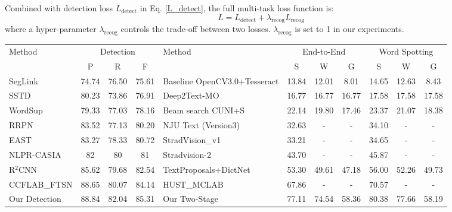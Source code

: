 \documentclass[10pt,twocolumn,letterpaper]{article}
\begin{document}
Combined with detection loss $L_{\text{detect}}$ in Eq. \eqref{L_detect}, the full multi-task loss function is:
\begin{equation}
L = L_{\text{detect}} + \lambda_{\text{recog}} L_{\text{recog}}
\end{equation}
where a hyper-parameter $\lambda_{\text{recog}}$ controls the trade-off between two losses. $\lambda_{\text{recog}}$ is set to 1 in our experiments.
\begin{table*}
\small
\begin{center}
\setlength{\tabcolsep}{5pt}
\begin{tabular}{l|ccc|l|ccc|ccc}
\hline
\multirow{2}{*}{Method} & \multicolumn{3}{c|}{Detection} & \multirow{2}{*}{Method} & \multicolumn{3}{c|}{End-to-End} & \multicolumn{3}{c}{Word Spotting}\\ \cline{2-4} \cline{6-11}
 & P & R & F & & S & W & G & S & W & G \\ \hline
SegLink \cite{shi2017seglink} & 74.74 & 76.50 & 75.61 & Baseline OpenCV3.0+Tesseract \cite{karatzas2015icdar15} & 13.84 & 12.01 & 8.01 & 14.65 & 12.63 & 8.43 \\
SSTD \cite{he2017sstd} & 80.23 & 73.86 & 76.91 & Deep2Text-MO \cite{yin2014robust,yin2015multi,jaderberg2016ijcv} & 16.77 & 16.77 & 16.77 & 17.58 & 17.58 & 17.58\\
WordSup \cite{hu2017wordsup} & 79.33 & 77.03& 78.16 & Beam search CUNI+S \cite{karatzas2015icdar15} & 22.14 & 19.80 & 17.46 & 23.37 & 21.07 & 18.38\\
RRPN \cite{ma2017rcnn} & 83.52 & 77.13 & 80.20 & NJU Text (Version3) \cite{karatzas2015icdar15} & 32.63 & - & - & 34.10 & - & - \\
EAST \cite{zhou2017east} & 83.27 & 78.33 & 80.72 & StradVision\_v1 \cite{karatzas2015icdar15} & 33.21 & - & - & 34.65 & - & - \\
NLPR-CASIA \cite{he2017casia} & 82 & 80 & 81 & Stradvision-2 \cite{karatzas2015icdar15} & 43.70 & - & - & 45.87 & - & - \\
R$^2$CNN \cite{jiang2017r2cnn} & 85.62 &79.68 & 82.54 & TextProposals+DictNet \cite{gomez2017textproposals,jaderberg2014synthetic} & 53.30 & 49.61 & 47.18 & 56.00 & 52.26 & 49.73 \\
CCFLAB\_FTSN \cite{dai2017fused} & 88.65 &80.07 &84.14 & HUST\_MCLAB \cite{shi2017seglink,shi2016crnn} & 67.86 & - & - & 70.57 & - & - \\ \hline
Our Detection & 88.84 & 82.04& 85.31 & Our Two-Stage & 77.11 & 74.54 &58.36 &80.38 &77.66 & 58.19\\

\end{tabular}
\end{center}
\end{table*}
\end{document}
